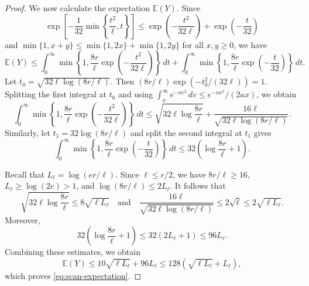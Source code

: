 \documentclass[12pt,a4paper]{article}
\numberwithin{equation}{section}
\theoremstyle{definition}
\theoremstyle{remark}
\begin{document}
\begin{proof}
We now calculate the expectation $\mathbb{E}(Y)$.  Since
$$
 \exp\left[-\frac1{32}\min\left\{\frac{t^2}{\ell},t\right\}\right]
 \le \exp\left(-\frac{t^2}{32\ell}\right)+\exp\left(-\frac t{32}\right)
$$
and $\min\{1,x+y\}\le\min\{1,2x\}+\min\{1,2y\}$ for all $x,y\ge0$, we have
$$ \mathbb{E}(Y)
 \le\int_0^\infty\min\left\{1,\frac{8r}{\ell}
       \exp\left(-\frac{t^2}{32\ell}\right)\right\}\,dt
   +\int_0^\infty\min\left\{1,\frac{8r}{\ell}
       \exp\left(-\frac t{32}\right)\right\}\,dt.$$
Let
$t_0=\sqrt{32\ell\log(8r/\ell)}$.
Then $(8r/\ell)\exp(-t_0^2/(32\ell))=1$.  Splitting the first integral at $t_0$ and using
$\int_x^\infty e^{-av^2}\,dv\le e^{-ax^2}/(2ax)$, we obtain
$$
 \int_0^\infty\min\left\{1,\frac{8r}{\ell}
       \exp\left(-\frac{t^2}{32\ell}\right)\right\}\,dt
 \le \sqrt{32\ell\log\frac{8r}{\ell}}
    +\frac{16\ell}{\sqrt{32\ell\log(8r/\ell)}}.
$$
Similarly, let $t_1=32\log(8r/\ell)$ and split the second integral at $t_1$ gives
$$
 \int_0^\infty\min\left\{1,\frac{8r}{\ell}
       \exp\left(-\frac t{32}\right)\right\}\,dt
 \le32\left(\log\frac{8r}{\ell}+1\right).
$$

Recall that $L_\ell=\log(er/\ell)$.  Since $\ell\le r/2$, we have
$8r/\ell\ge16$, $L_\ell\ge\log(2e)>1$, and
$\log(8r/\ell)\le2L_\ell$.  
It follows that
$$
 \sqrt{32\ell\log\frac{8r}{\ell}}
 \le8\sqrt{\ell L_\ell}
\quad \text{and} \quad
 \frac{16\ell}{\sqrt{32\ell\log(8r/\ell)}}
 \le2\sqrt{\ell}
 \le2\sqrt{\ell L_\ell}.
$$
Moreover,
$$
 32\left(\log\frac{8r}{\ell}+1\right)
 \le32(2L_\ell+1)
 \le96L_\ell.
$$
Combining these estimates, we obtain
$$ \mathbb{E}(Y)
 \le10\sqrt{\ell L_\ell}+96L_\ell
 \le128\left(\sqrt{\ell L_\ell}+L_\ell\right),$$
which proves \eqref{eq:scan-expectation}.
\end{proof}
\end{document}
